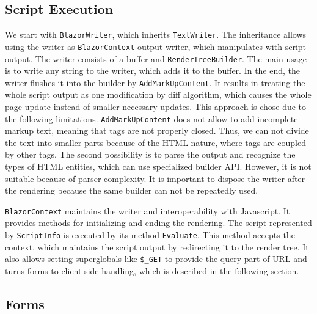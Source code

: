\subsection{Script Execution}
We start with \texttt{BlazorWriter}, which inherits \texttt{TextWriter}.
The inheritance allows using the writer as \texttt{BlazorContext} output writer, which manipulates with script output.
The writer consists of a buffer and \texttt{RenderTreeBuilder}.
The main usage is to write any string to the writer, which adds it to the buffer.
In the end, the writer flushes it into the builder by \texttt{AddMarkUpContent}.
It results in treating the whole script output as one modification by diff algorithm, which causes the whole page update instead of smaller necessary updates.
This approach is chose due to the following limitations.
\texttt{AddMarkUpContent} does not allow to add incomplete markup text, meaning that tags are not properly closed.
Thus, we can not divide the text into smaller parts because of the HTML nature, where tags are coupled by other tags.
The second possibility is to parse the output and recognize the types of HTML entities, which can use specialized builder API.
However, it is not suitable because of parser complexity.
It is important to dispose the writer after the rendering because the same builder can not be repeatedly used.
\par
\texttt{BlazorContext} maintains the writer and interoperability with Javascript.
It provides methods for initializing and ending the rendering.
The script represented by \texttt{ScriptInfo} is executed by its method \texttt{Evaluate}. This method accepts the context, which maintains the script output by redirecting it to the render tree.
It also allows setting superglobals like \texttt{\$\_GET} to provide the query part of URL and turns forms to client-side 
handling, which is described in the following section.

\subsection{Forms}

